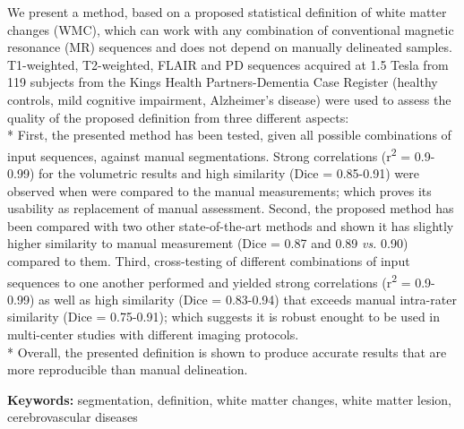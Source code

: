 We present a method, based on a proposed statistical definition of white matter changes (WMC), which can work with any combination of conventional magnetic resonance (MR) sequences and does not depend on manually delineated samples. T1-weighted, T2-weighted, FLAIR and PD sequences acquired at 1.5 Tesla from 119 subjects from the Kings Health Partners-Dementia Case Register (healthy controls, mild cognitive impairment, Alzheimer’s disease) were used to assess the quality of the proposed definition from three different aspects:
\\*
First, the presented method has been tested, given all possible combinations of input sequences, against manual segmentations. Strong correlations (r\textsuperscript{2} = 0.9-0.99) for the volumetric results and high similarity (Dice = 0.85-0.91) were observed when were compared to the manual measurements; which proves its usability as replacement of manual assessment.
Second, the proposed method has been compared with two other state-of-the-art methods and shown it has slightly higher similarity to manual measurement (Dice = 0.87 and 0.89 \textit{vs.} 0.90) compared to them.
Third, cross-testing of different combinations of input sequences to one another performed and yielded strong correlations (r\textsuperscript{2} = 0.9-0.99) as well as high similarity (Dice = 0.83-0.94) that exceeds manual intra-rater similarity (Dice = 0.75-0.91); which suggests it is robust enought to be used in multi-center studies with different imaging protocols.
\\*
Overall, the presented definition is shown to produce accurate results that are more reproducible than manual delineation.

\textbf{Keywords:} segmentation, definition, white matter changes, white matter lesion, cerebrovascular diseases

  
  
  
  
  
  
  
  
  